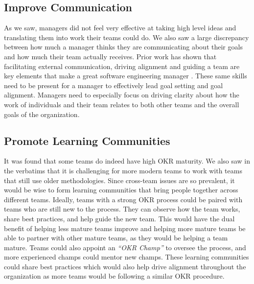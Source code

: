 \documentclass[sigconf, nonacm]{acmart}
\begin{document}
\subsection{Improve Communication}
As we saw, managers did not feel very effective at taking high level ideas and translating them into work their teams could do. We also saw a large discrepancy between how much a manager thinks they are communicating about their goals and how much their team actually receives. Prior work has shown that facilitating external communication, driving alignment and guiding a team are key elements that make a great software engineering manager \cite{greatmanager}. These same skills need to be present for a manager to effectively lead goal setting and goal alignment. Managers need to especially focus on driving clarity about how the work of individuals and their team relates to both other teams and the overall goals of the organization.

\subsection{Promote Learning Communities}
It was found that some teams do indeed have high OKR maturity. We also saw in the verbatims that it is challenging for more modern teams to work with teams that still use older methodologies. Since cross-team issues are so prevalent, it would be wise to form learning communities that bring people together across different teams. Ideally, teams with a strong OKR process could be paired with teams who are still new to the process. They can observe how the team works, share best practices, and help guide the new team. This would have the dual benefit of helping less mature teams improve and helping more mature teams be able to partner with other mature teams, as they would be helping a team mature. Teams could also appoint an \emph{``OKR Champ''} to oversee the process, and more experienced champs could mentor new champs. These learning communities could share best practices which would also help drive alignment throughout the organization as more teams would be following a similar OKR procedure.
\end{document}
